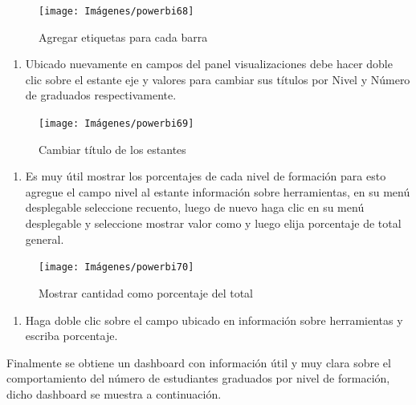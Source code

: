 \documentclass[
]{book}
\providecommand{\tightlist}{%
  \setlength{\itemsep}{0pt}\setlength{\parskip}{0pt}}
\begin{document}
\begin{figure}

{\centering \texttt{[image: Imágenes/powerbi68]} 

}

\caption{Agregar etiquetas para cada barra}\label{fig:paso5barras-fig}
\end{figure}

\begin{enumerate}
\def\labelenumi{\arabic{enumi}.}
\setcounter{enumi}{5}
\tightlist
\item
  Ubicado nuevamente en campos del panel visualizaciones debe hacer doble clic sobre el estante eje y valores para cambiar sus títulos por Nivel y Número de graduados respectivamente.
\end{enumerate}

\begin{figure}

{\centering \texttt{[image: Imágenes/powerbi69]} 

}

\caption{Cambiar título de los estantes}\label{fig:paso6barras-fig}
\end{figure}

\begin{enumerate}
\def\labelenumi{\arabic{enumi}.}
\setcounter{enumi}{6}
\tightlist
\item
  Es muy útil mostrar los porcentajes de cada nivel de formación para esto agregue el campo nivel al estante información sobre herramientas, en su menú desplegable seleccione recuento, luego de nuevo haga clic en su menú desplegable y seleccione mostrar valor como y luego elija porcentaje de total general.
\end{enumerate}

\begin{figure}

{\centering \texttt{[image: Imágenes/powerbi70]} 

}

\caption{Mostrar cantidad como porcentaje del total}\label{fig:paso7barras-fig}
\end{figure}

\begin{enumerate}
\def\labelenumi{\arabic{enumi}.}
\setcounter{enumi}{7}
\tightlist
\item
  Haga doble clic sobre el campo ubicado en información sobre herramientas y escriba porcentaje.
\end{enumerate}

Finalmente se obtiene un dashboard con información útil y muy clara sobre el comportamiento del número de estudiantes graduados por nivel de formación, dicho dashboard se muestra a continuación.
\end{document}
